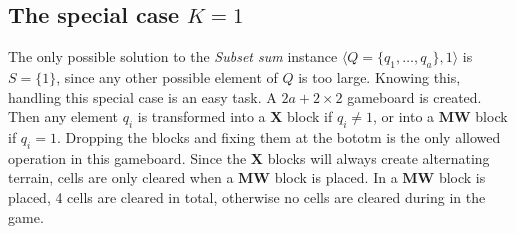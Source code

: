 \subsection{The special case $K = 1$}
The only possible solution to the \textit{Subset sum} instance $\langle Q = \{q_1, \ldots, q_a\}, 1 \rangle$ is $S = \{1\}$, since any other possible element of $Q$ is too large. Knowing this, handling this special case is an easy task. A $2a+2 \times 2$ gameboard is created. Then any element $q_i$ is transformed into a $\mathbf{X}$ block if $q_i \not = 1$, or into a $\mathbf{MW}$ block if $q_i = 1$. Dropping the blocks and fixing them at the bototm is the only allowed operation in this gameboard. Since the $\mathbf{X}$ blocks will always create alternating terrain, cells are only cleared when a $\mathbf{MW}$ block is placed. In a $\mathbf{MW}$ block is placed, 4 cells are cleared in total, otherwise no cells are cleared during in the game.
